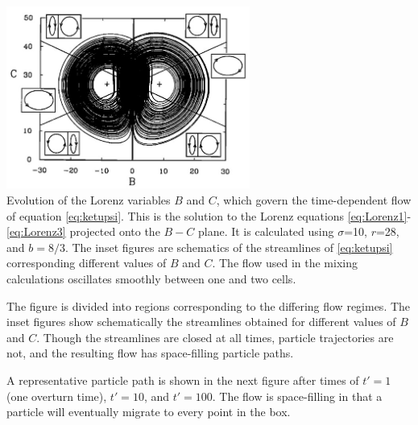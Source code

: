 \begin{center}
\includegraphics[width=8cm]{python_codes/fieldstone_156/images/ketu90a}\\
{\captionfont Evolution of the Lorenz variables $B$ and $C$,
which govern the time-dependent flow of equation \eqref{eq:ketupsi}.
This is the solution to the Lorenz equations
\eqref{eq:Lorenz1}-\eqref{eq:Lorenz3} projected onto the $B-C$ plane. It is calculated
using  $\sigma$=10, $r$=28, and $b = 8/3$. The inset figures are
schematics of the streamlines of \eqref{eq:ketupsi} corresponding
different values of $B$ and $C$. The flow used in the mixing 
calculations oscillates smoothly between one and two cells.}
\end{center}

The figure is divided into regions corresponding
to the differing flow regimes. The inset figures
show schematically the streamlines obtained for
different values of $B$ and $C$. Though the streamlines
are closed at all times, particle trajectories are not, and
the resulting flow has space-filling particle paths.

A representative particle path is shown in the next figure
after times of $t'=1$ (one overturn time), $t'=10$, and $t'=100$.
The flow is space-filling in that a particle will eventually
migrate to every point in the box. 


